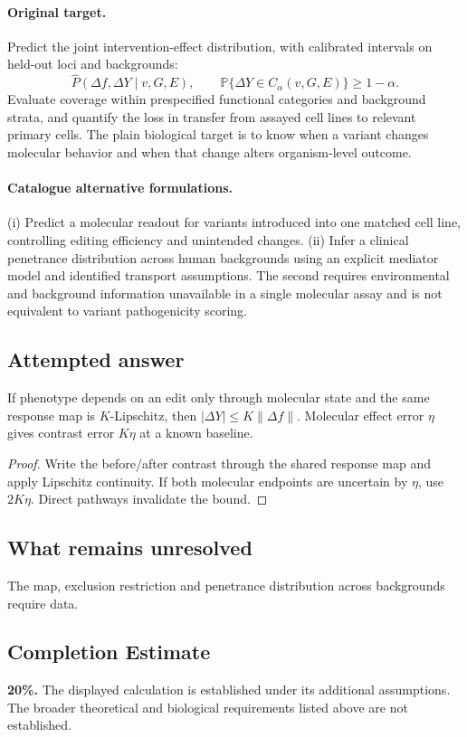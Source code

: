 \documentclass[11pt]{article}
\begin{document}
\paragraph{Original target.}
Predict the joint intervention-effect distribution, with calibrated intervals on held-out loci and backgrounds:
\[\widehat P(\Delta f,\Delta Y\mid v,G,E),\qquad \mathbb{P}\{\Delta Y\in C_\alpha(v,G,E)\}\ge1-\alpha.\]
Evaluate coverage within prespecified functional categories and background strata, and quantify the loss in transfer from assayed cell lines to relevant primary cells. The plain biological target is to know when a variant changes molecular behavior and when that change alters organism-level outcome.
\paragraph{Catalogue alternative formulations.}
(i) Predict a molecular readout for variants introduced into one matched cell line, controlling editing efficiency and unintended changes. (ii) Infer a clinical penetrance distribution across human backgrounds using an explicit mediator model and identified transport assumptions. The second requires environmental and background information unavailable in a single molecular assay and is not equivalent to variant pathogenicity scoring.
\subsection{Attempted answer}
\begin{proposition}
If phenotype depends on an edit only through molecular state and the same response map is $K$-Lipschitz, then $|\Delta Y|\leq K\|\Delta f\|$. Molecular effect error $\eta$ gives contrast error $K\eta$ at a known baseline.
\end{proposition}
\begin{proof}
Write the before/after contrast through the shared response map and apply Lipschitz continuity. If both molecular endpoints are uncertain by $\eta$, use $2K\eta$. Direct pathways invalidate the bound.
\end{proof}
\subsection{What remains unresolved}
The map, exclusion restriction and penetrance distribution across backgrounds require data.
\subsection{Completion Estimate}
\textbf{20\%.} The displayed calculation is established under its additional assumptions. The broader theoretical and biological requirements listed above are not established.
\end{document}
